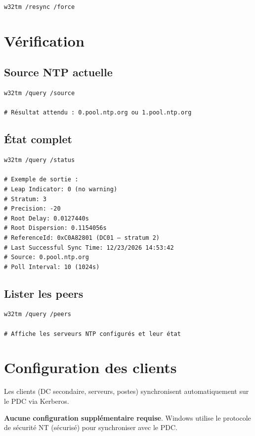 \begin{lstlisting}[style=powershell]
w32tm /resync /force
\end{lstlisting}

\section{Vérification}

\subsection{Source NTP actuelle}

\begin{lstlisting}[style=powershell]
w32tm /query /source

# Résultat attendu : 0.pool.ntp.org ou 1.pool.ntp.org
\end{lstlisting}

\subsection{État complet}

\begin{lstlisting}[style=powershell]
w32tm /query /status

# Exemple de sortie :
# Leap Indicator: 0 (no warning)
# Stratum: 3
# Precision: -20
# Root Delay: 0.0127440s
# Root Dispersion: 0.1154056s
# ReferenceId: 0xC0A82801 (DC01 — stratum 2)
# Last Successful Sync Time: 12/23/2026 14:53:42
# Source: 0.pool.ntp.org
# Poll Interval: 10 (1024s)
\end{lstlisting}

\subsection{Lister les peers}

\begin{lstlisting}[style=powershell]
w32tm /query /peers

# Affiche les serveurs NTP configurés et leur état
\end{lstlisting}

\section{Configuration des clients}

Les clients (DC secondaire, serveurs, postes) synchronisent automatiquement sur le PDC via Kerberos.

\textbf{Aucune configuration supplémentaire requise}. Windows utilise le protocole de sécurité NT (sécurisé) pour synchroniser avec le PDC.

